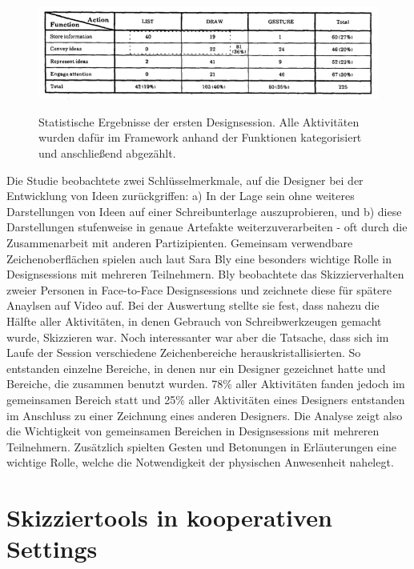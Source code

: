 \begin{figure}
        {\includegraphics[width=1\linewidth]{gfx/tangStatistik}}
		\caption[Statistische Ergebnisse der ersten Designsession \newline \citep{Tang:1988p279}]{Statistische Ergebnisse der ersten Designsession. Alle Aktivitäten wurden dafür im Framework anhand der Funktionen kategorisiert und anschließend abgezählt.}\label{fig:tangStatistik}
\end{figure}

\medskip Die Studie beobachtete zwei Schlüsselmerkmale, auf die Designer bei der Entwicklung von Ideen zurückgriffen: a) In der Lage sein ohne weiteres Darstellungen von Ideen auf einer Schreibunterlage auszuprobieren, und b) diese Darstellungen stufenweise in genaue Artefakte weiterzuverarbeiten - oft durch die Zusammenarbeit mit anderen Partizipienten. \citep{Tang:1988p279}
\clearpage
\medskip Gemeinsam verwendbare Zeichenoberflächen spielen auch laut Sara Bly \citep{Bly:1988:UDS:62266.62286} eine besonders wichtige Rolle in Designsessions mit mehreren Teilnehmern. 
Bly beobachtete das Skizzierverhalten zweier Personen in Face-to-Face Designsessions und zeichnete diese für spätere Anaylsen auf Video auf. Bei der Auswertung stellte sie fest, dass nahezu die Hälfte aller Aktivitäten, in denen Gebrauch von Schreibwerkzeugen gemacht wurde, Skizzieren war. Noch interessanter war aber die Tatsache, dass sich im Laufe der Session verschiedene Zeichenbereiche herauskristallisierten. So entstanden einzelne Bereiche, in denen nur ein Designer gezeichnet hatte und Bereiche, die zusammen benutzt wurden. 78\% aller Aktivitäten fanden jedoch im gemeinsamen Bereich statt und 25\% aller Aktivitäten eines Designers entstanden im Anschluss zu einer Zeichnung eines anderen Designers. Die Analyse zeigt also die Wichtigkeit von gemeinsamen Bereichen in Designsessions mit mehreren Teilnehmern. Zusätzlich spielten Gesten und Betonungen in Erläuterungen eine wichtige Rolle, welche die Notwendigkeit der physischen Anwesenheit nahelegt.

\section{Skizziertools in kooperativen Settings}

